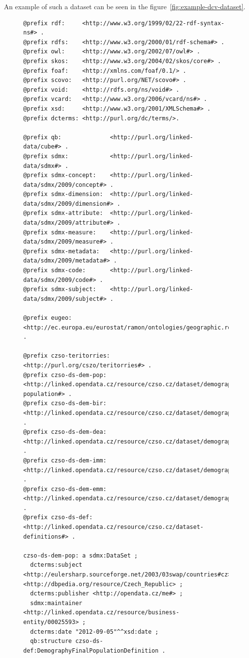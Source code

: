 An example of such a dataset can be seen in the 
figure~\ref{fig:example-dcv-dataset}.

\begin{figure}
\tiny\begin{verbatim}
@prefix rdf:     <http://www.w3.org/1999/02/22-rdf-syntax-ns#> .
@prefix rdfs:    <http://www.w3.org/2000/01/rdf-schema#> .
@prefix owl:     <http://www.w3.org/2002/07/owl#> .
@prefix skos:    <http://www.w3.org/2004/02/skos/core#> .
@prefix foaf:    <http://xmlns.com/foaf/0.1/> .
@prefix scovo:   <http://purl.org/NET/scovo#> .
@prefix void:    <http://rdfs.org/ns/void#> .
@prefix vcard:   <http://www.w3.org/2006/vcard/ns#> .
@prefix xsd:     <http://www.w3.org/2001/XMLSchema#> .
@prefix dcterms: <http://purl.org/dc/terms/>.

@prefix qb:              <http://purl.org/linked-data/cube#> .
@prefix sdmx:            <http://purl.org/linked-data/sdmx#> .
@prefix sdmx-concept:    <http://purl.org/linked-data/sdmx/2009/concept#> .
@prefix sdmx-dimension:  <http://purl.org/linked-data/sdmx/2009/dimension#> .
@prefix sdmx-attribute:  <http://purl.org/linked-data/sdmx/2009/attribute#> .
@prefix sdmx-measure:    <http://purl.org/linked-data/sdmx/2009/measure#> .
@prefix sdmx-metadata:   <http://purl.org/linked-data/sdmx/2009/metadata#> .
@prefix sdmx-code:       <http://purl.org/linked-data/sdmx/2009/code#> .
@prefix sdmx-subject:    <http://purl.org/linked-data/sdmx/2009/subject#> .

@prefix eugeo: <http://ec.europa.eu/eurostat/ramon/ontologies/geographic.rdf#> .

@prefix czso-teritorries:  <http://purl.org/cszo/teritorries#> .
@prefix czso-ds-dem-pop:   <http://linked.opendata.cz/resource/czso.cz/dataset/demography/final-population#> .
@prefix czso-ds-dem-bir:   <http://linked.opendata.cz/resource/czso.cz/dataset/demography/births#> .
@prefix czso-ds-dem-dea:   <http://linked.opendata.cz/resource/czso.cz/dataset/demography/deaths#> .
@prefix czso-ds-dem-imm:   <http://linked.opendata.cz/resource/czso.cz/dataset/demography/immigrants#> .
@prefix czso-ds-dem-emm:   <http://linked.opendata.cz/resource/czso.cz/dataset/demography/emmigrants#> .
@prefix czso-ds-def:       <http://linked.opendata.cz/resource/czso.cz/dataset-definitions#> .

czso-ds-dem-pop: a sdmx:DataSet ;
  dcterms:subject <http://eulersharp.sourceforge.net/2003/03swap/countries#cz>, <http://dbpedia.org/resource/Czech_Republic> ;
  dcterms:publisher <http://opendata.cz/me#> ;
  sdmx:maintainer <http://linked.opendata.cz/resource/business-entity/00025593> ;
  dcterms:date "2012-09-05"^^xsd:date ;
  qb:structure czso-ds-def:DemographyFinalPopulationDefinition .
  

\end{verbatim}
\end{figure}

